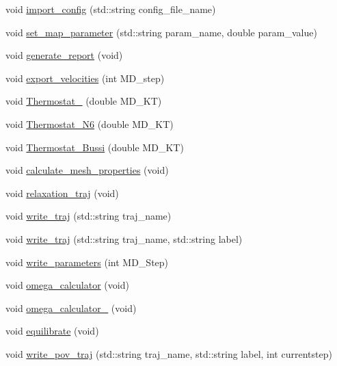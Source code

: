 \begin{DoxyCompactItemize}
\item 
void \mbox{\hyperlink{classMembrane_aa332912bee38f3a4a0c45261ffbc497f}{import\+\_\+config}} (std\+::string config\+\_\+file\+\_\+name)
\item 
void \mbox{\hyperlink{classMembrane_a58d16cfe9b99aebed6484ef9acbfcb95}{set\+\_\+map\+\_\+parameter}} (std\+::string param\+\_\+name, double param\+\_\+value)
\item 
void \mbox{\hyperlink{classMembrane_a36462fa0881cf8ee5a0c7268ae4fdd30}{generate\+\_\+report}} (void)
\item 
void \mbox{\hyperlink{classMembrane_ac71c4da5a974b65e764fff394a2f1eb4}{export\+\_\+velocities}} (int M\+D\+\_\+step)
\item 
void \mbox{\hyperlink{classMembrane_acd87b1b9cf2c6c91a887749528c9f556}{Thermostat\+\_}} (double M\+D\+\_\+\+KT)
\item 
void \mbox{\hyperlink{classMembrane_a332a06e823418b7ee30408e1fca2bdf2}{Thermostat\+\_\+\+N6}} (double M\+D\+\_\+\+KT)
\item 
void \mbox{\hyperlink{classMembrane_afc6d859617b4fa00b316cce1e36ef9bc}{Thermostat\+\_\+\+Bussi}} (double M\+D\+\_\+\+KT)
\item 
void \mbox{\hyperlink{classMembrane_adb71eee849f346efcd7303241a3469c2}{calculate\+\_\+mesh\+\_\+properties}} (void)
\item 
void \mbox{\hyperlink{classMembrane_aa4286fd20ae452585ec5d19c67268eed}{relaxation\+\_\+traj}} (void)
\item 
void \mbox{\hyperlink{classMembrane_a74ebace0e97952e966f1fe3babf420a7}{write\+\_\+traj}} (std\+::string traj\+\_\+name)
\item 
void \mbox{\hyperlink{classMembrane_ace8dd26e72369937db74fadcab2726aa}{write\+\_\+traj}} (std\+::string traj\+\_\+name, std\+::string label)
\item 
void \mbox{\hyperlink{classMembrane_a1cf1d4947d79a4529239f292534b9e19}{write\+\_\+parameters}} (int M\+D\+\_\+\+Step)
\item 
void \mbox{\hyperlink{classMembrane_a72796df96d3748c43543f10b85d26145}{omega\+\_\+calculator}} (void)
\item 
void \mbox{\hyperlink{classMembrane_a2877e319db184da4fb5294d372400fa0}{omega\+\_\+calculator\+\_}} (void)
\item 
void \mbox{\hyperlink{classMembrane_a3c8f8e0f98162bab1d769b73498ba8c4}{equilibrate}} (void)
\item 
void \mbox{\hyperlink{classMembrane_a4b2c1a070787e45652d2055311b9685d}{write\+\_\+pov\+\_\+traj}} (std\+::string traj\+\_\+name, std\+::string label, int currentstep)

\end{DoxyCompactItemize}
